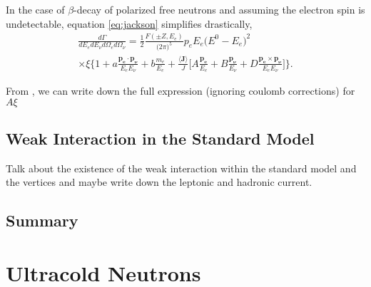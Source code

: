 In the case of $\beta$-decay of polarized free neutrons and assuming the electron spin is undetectable,
equation \ref{eq:jackson} simplifies drastically,
%
\begin{multline}
  \frac{d\Gamma}{dE_e dE_\nu d\Omega_e d\Omega_\nu} = \frac{1}{2} \frac{F(\pm Z, E_e)}{\big( 2\pi \big)^5}
  p_e E_e \big( E^0 - E_e \big)^2 \\ \times \xi 
  \Bigg\{ 1 + a\frac{\boldsymbol{p_e \cdot p_\nu}}{E_e E_\nu} + b\frac{m_e}{E_e} 
  + \frac{\boldsymbol{\langle J \rangle}}{J} \Bigg[ A\frac{\boldsymbol{p_e}}{E_e}
    + B\frac{\boldsymbol{p_\nu}}{E_\nu} + D\frac{\boldsymbol{p_e \times p_\nu}}{E_e E_\nu}\Bigg]
  \Bigg\}.
  \label{eq:jacksonSimple}
\end{multline}
%

From \cite{jackson1957a}, we can write down the full expression (ignoring coulomb corrections)
for $A\xi$ 



\subsection{Weak Interaction in the Standard Model}
Talk about the existence of the weak interaction within the standard model and
the vertices and maybe write down the leptonic and hadronic current.


\subsection{Summary}


\section{Ultracold Neutrons}



